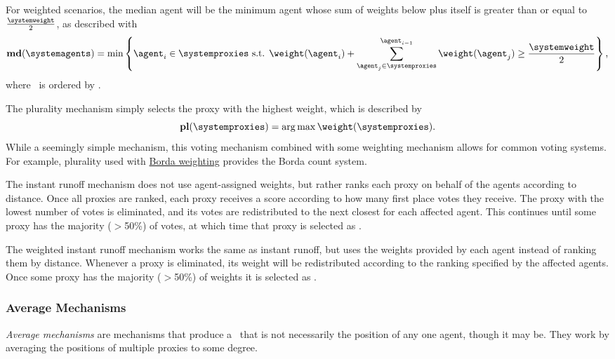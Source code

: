 For weighted scenarios, the median agent will be the minimum agent whose sum of
weights below plus itself is greater than or equal to $\frac{\systemweight}{2}$,
as described with
\begin{equation}
    \textbf{md}(\systemagents) = \min\left\{
    \agent_i \in \systemproxies \text{ s.t. }
    \weightof{\agent_i} +
    \sum_{\agent_j \in \systemproxies}^{\agent_{i - 1}} \weightof{\agent_j}
    \geq \frac{\systemweight}{2}
    \right\}
    \text{,}\label{eq:median-mechanism}
\end{equation}
where \systemproxies\ is ordered by \agenttruth.

The plurality mechanism simply selects the proxy with the highest weight, which
is described by
\begin{equation}
    \textbf{pl}(\systemproxies) =
    \argmax \weightof{\systemproxies}
    \text{.}\label{eq:plurality-mechanism}
\end{equation}
While a seemingly simple mechanism, this voting mechanism combined with some
weighting mechanism allows for common voting systems.
For example, plurality used with \hyperref[para:borda]{Borda weighting}
provides the Borda count system.

\label{para:candidate-instant-runoff}
The instant runoff mechanism does not use agent-assigned weights, but rather
ranks each proxy on behalf of the agents according to distance.
Once all proxies are ranked, each proxy receives a score according to how
many first place votes they receive.
The proxy with the lowest number of votes is eliminated, and its votes are
redistributed to the next closest for each affected agent.
This continues until some proxy has the majority ($>$50\%) of votes, at which
time that proxy is selected as \systemtruth.

\label{para:candidate-weighted-instant-runoff}
The weighted instant runoff mechanism works the same as instant runoff, but uses
the weights provided by each agent instead of ranking them by distance.
Whenever a proxy is eliminated, its weight will be redistributed according to
the ranking specified by the affected agents.
Once some proxy has the majority ($>$50\%) of weights it is selected as
\systemtruth.

\subsubsection{Average Mechanisms}\label{subsubsec:average-mechanisms}
\textit{Average mechanisms} are mechanisms that produce a \systemtruth\ that
is not necessarily the position of any one agent, though it may be.
They work by averaging the positions of multiple proxies to some degree.

